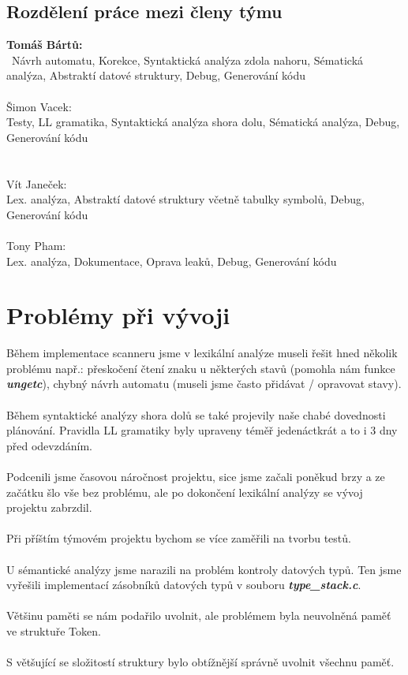 \documentclass[12pt, letterpaper]{article}
\begin{document}
	\subsection{Rozdělení práce mezi členy týmu}
	\Large 
	\textbf{Tomáš Bártů:}\\\
	Návrh automatu, Korekce, Syntaktická analýza zdola nahoru, Sématická analýza, Abstraktí datové struktury, Debug, Generování kódu \\
	\\
	Šimon Vacek:\\
	Testy, LL gramatika, Syntaktická analýza shora dolu, Sématická analýza, Debug, Generování kódu\\
	\\\\
	Vít Janeček:\\
	Lex. analýza, Abstraktí datové struktury včetně tabulky symbolů, Debug, Generování kódu\\
	\\
	Tony Pham:\\
	Lex. analýza, Dokumentace, Oprava leaků, Debug, Generování kódu\\
	\newpage
	\section{Problémy při vývoji}
	\large
    Během implementace scanneru jsme v lexikální analýze museli řešit hned několik problému např.: přeskočení čtení znaku u některých stavů (pomohla nám funkce \textbf{\textit{ungetc}}), chybný návrh automatu (museli jsme často přidávat / opravovat stavy).
	\\
	\\
	Během syntaktické analýzy shora dolů se také projevily naše chabé dovednosti plánování. Pravidla LL gramatiky byly upraveny téměř jedenáctkrát a to i 3 dny před odevzdáním.
	\\
	\\
	Podcenili jsme časovou náročnost projektu, sice jsme začali poněkud brzy a ze začátku šlo vše bez problému, ale po dokončení lexikální analýzy se vývoj projektu zabrzdil.
	\\
	\\
	Při příštím týmovém projektu bychom se více zaměřili na tvorbu testů.
	\\
	\\
	U sémantické analýzy jsme narazili na problém kontroly datových typů. Ten jsme vyřešili implementací zásobníků datových typů v souboru \textbf{\textit{type\_stack.c}}.
	\\
	\\
	Většinu paměti se nám podařilo uvolnit, ale problémem byla neuvolněná paměť ve struktuře
	Token.
	\\
	\\
	S většující se složitostí struktury bylo obtížnější správně uvolnit všechnu paměť.
	\newpage
\end{document}
